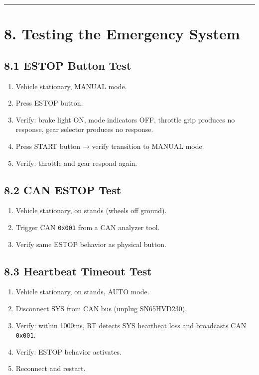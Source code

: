 \documentclass[12pt,a4paper,oneside]{report}
\providecommand{\tightlist}{\setlength{\itemsep}{0pt}\setlength{\parskip}{0pt}}
\begin{document}
\begin{center}\rule{0.5\linewidth}{0.5pt}\end{center}

\section{8. Testing the Emergency System}\label{testing-the-emergency-system}

\subsection{8.1 ESTOP Button Test}\label{estop-button-test}

\begin{enumerate}
\def\labelenumi{\arabic{enumi}.}
\tightlist
\item
  Vehicle stationary, MANUAL mode.
\item
  Press ESTOP button.
\item
  Verify: brake light ON, mode indicators OFF, throttle grip produces no
  response, gear selector produces no response.
\item
  Press START button → verify transition to MANUAL mode.
\item
  Verify: throttle and gear respond again.
\end{enumerate}

\subsection{8.2 CAN ESTOP Test}\label{can-estop-test}

\begin{enumerate}
\def\labelenumi{\arabic{enumi}.}
\tightlist
\item
  Vehicle stationary, on stands (wheels off ground).
\item
  Trigger CAN \texttt{0x001} from a CAN analyzer tool.
\item
  Verify same ESTOP behavior as physical button.
\end{enumerate}

\subsection{8.3 Heartbeat Timeout Test}\label{heartbeat-timeout-test}

\begin{enumerate}
\def\labelenumi{\arabic{enumi}.}
\tightlist
\item
  Vehicle stationary, on stands, AUTO mode.
\item
  Disconnect SYS from CAN bus (unplug SN65HVD230).
\item
  Verify: within 1000ms, RT detects SYS heartbeat loss and broadcasts CAN
  \texttt{0x001}.
\item
  Verify: ESTOP behavior activates.
\item
  Reconnect and restart.
\end{enumerate}
\end{document}
